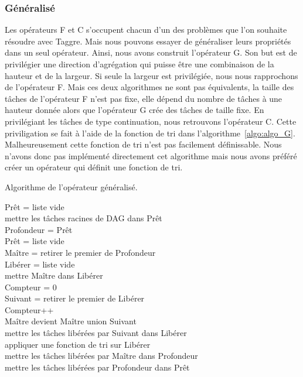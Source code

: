 \subsubsection{Généralisé}
Les opérateurs F et C s'occupent chacun d'un des problèmes que l'on souhaite résoudre avec Taggre.
%
Mais nous pouvons essayer de généraliser leurs propriétés dans un seul opérateur.
%
Ainsi, nous avons construit l'opérateur G.
%
Son but est de privilégier une direction d'agrégation qui puisse être une combinaison de la hauteur et de la largeur.
%
Si seule la largeur est privilégiée, nous nous rapprochons de l'opérateur F.
%
Mais ces deux algorithmes ne sont pas équivalents, la taille des tâches de l'opérateur F n'est pas fixe, elle dépend du nombre de tâches à une hauteur donnée alors que l'opérateur G crée des tâches de taille fixe.
%
En privilégiant les tâches de type continuation, nous retrouvons l'opérateur C.
%
Cette priviligation se fait à l'aide de la fonction de tri dans l'algorithme~\ref{algo:algo_G}.
%
Malheureusement cette fonction de tri n'est pas facilement définissable.
%
Nous n'avons donc pas implémenté directement cet algorithme mais nous avons préféré créer un opérateur qui définit une fonction de tri.


\begin{algorithm}
  \caption{Algorithme de l'opérateur généralisé.}
  \label{algo:algo_G}
  {\sc Prêt} = liste vide \\
  mettre les tâches racines de DAG dans {\sc Prêt} \\
   {
    {\sc Profondeur} = {\sc Prêt} \\
    {\sc Prêt} = liste vide \\
     {
      {\sc Maître} = retirer le premier de {\sc Profondeur} \\
      {\sc Libérer} = liste vide \\
      mettre {\sc Maître} dans {\sc Libérer} \\
      {\sc Compteur} = 0 \\
       {
        {\sc Suivant} = retirer le premier de {\sc Libérer} \\
        {\sc Compteur}++\\
        {\sc Maître} devient {\sc Maître} union {\sc Suivant}\\
        mettre les tâches libérées par {\sc Suivant} dans {\sc Libérer} \\
        appliquer une fonction de tri sur {\sc Libérer} \\
      }
      mettre les tâches libérées par {\sc Maître} dans {\sc Profondeur} \\
    }
    mettre les tâches libérées par {\sc Profondeur} dans {\sc Prêt}\\
  }
\end{algorithm}
